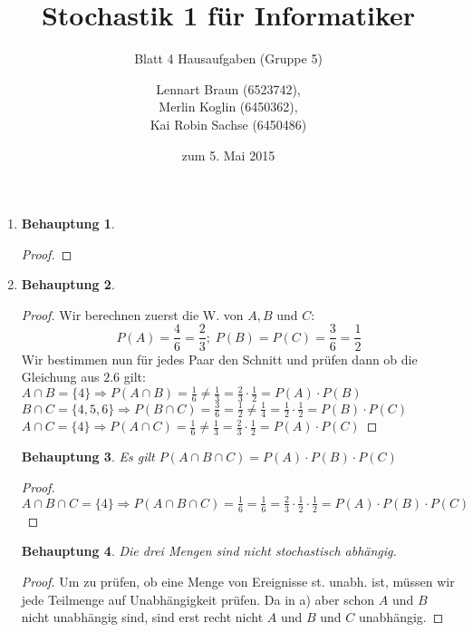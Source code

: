 \documentclass[a4paper]{scrartcl}
\title{Stochastik 1 für Informatiker}
\subtitle{Blatt 4 Hausaufgaben (Gruppe 5)}
\author{
    Lennart Braun (6523742), \\
    Merlin Koglin (6450362), \\
    Kai Robin Sachse (6450486)
}
\date{zum 5. Mai 2015}
\newtheorem*{behaupt}{Behauptung}
\begin{document}
\maketitle

\begin{enumerate}[label=\bfseries\arabic*.]
    \item
        \begin{behaupt}
            
        \end{behaupt}
        \begin{proof}
           
        \end{proof}

    \item	        
        	\begin{behaupt}
        	
        	\end{behaupt}
        	\begin{proof}
        	Wir berechnen zuerst die W. von $A,B$ und $C$:
			\begin{equation*}
			P(A)=\frac{4}{6}=\frac{2}{3};\; P(B)=P(C)=\frac{3}{6}=\frac{1}{2}
			\end{equation*}
			Wir bestimmen nun für jedes Paar den Schnitt und prüfen dann ob die Gleichung aus $2.6$ gilt:\\     
        	$A\cap B=\{4\}\Rightarrow P(A\cap B)=\frac{1}{6}\ne \frac{1}{3} = 
        	\frac{2}{3}\cdot \frac{1}{2} =P(A)\cdot P(B)$\\
        	$B\cap C=\{4,5,6\}\Rightarrow P(B\cap C)=\frac{3}{6}=\frac{1}{2} \ne \frac{1}{4} =
        	\frac{1}{2}\cdot \frac{1}{2} =P(B)\cdot P(C)$\\
        	$A\cap C=\{4\}\Rightarrow P(A\cap C)=\frac{1}{6}\ne \frac{1}{3} =
        	\frac{2}{3}\cdot \frac{1}{2} =P(A)\cdot P(C)$
        	\end{proof}
        	
        	
        	\begin{behaupt}
        	Es gilt $P(A\cap B\cap C)=P(A)\cdot P(B)\cdot P(C)$
        	\end{behaupt}
        	\begin{proof}
        	$A\cap B\cap C=\{4\}\Rightarrow P(A\cap B\cap C)=\frac{1}{6} = \frac{1}{6}=
        	\frac{2}{3}\cdot \frac{1}{2}\cdot \frac{1}{2}= P(A)\cdot P(B)\cdot P(C)$
        	\end{proof}
        	
        	\begin{behaupt}
        	Die drei Mengen sind nicht stochastisch abhängig.
        	\end{behaupt}
        	\begin{proof}
        	Um zu prüfen, ob eine Menge von Ereignisse st. unabh. ist, müssen wir jede
        	Teilmenge auf Unabhängigkeit prüfen. Da in a) aber schon $A$ und $B$ nicht
        	unabhängig sind, sind erst recht nicht $A$ und $B$ und $C$ unabhängig.
        	\end{proof}


\end{enumerate}
\end{document}
